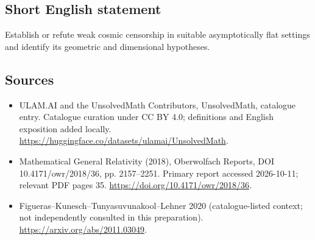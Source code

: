\documentclass[11pt]{article}
\begin{document}
\subsection{Short English statement}
Establish or refute weak cosmic censorship in suitable asymptotically flat settings and identify its geometric and dimensional hypotheses.
\subsection{Sources}
\begin{itemize}
\item[\hypertarget{source:statement:1}{S1}] ULAM.AI and the UnsolvedMath Contributors, UnsolvedMath, catalogue entry. Catalogue curation under CC BY 4.0; definitions and English exposition added locally.
\url{https://huggingface.co/datasets/ulamai/UnsolvedMath}.
\item[\hypertarget{source:statement:2}{S2}] Mathematical General Relativity (2018), Oberwolfach Reports, DOI 10.4171/owr/2018/36, pp. 2157--2251. Primary report accessed 2026-10-11; relevant PDF pages 35.
\url{https://doi.org/10.4171/owr/2018/36}.
\item[\hypertarget{source:statement:3}{S3}] Figueras--Kunesch--Tunyasuvunakool--Lehner 2020 (catalogue-listed context; not independently consulted in this preparation).
\url{https://arxiv.org/abs/2011.03049}.
\end{itemize}
\label{end:statement}
\end{document}
